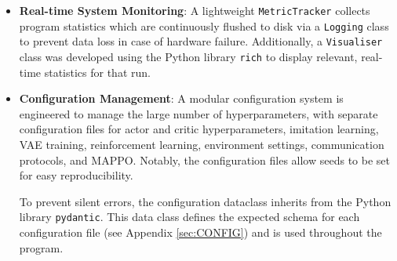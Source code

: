 \begin{itemize}
\item \textbf{Real-time System Monitoring}:
A lightweight \lstinline[language=Python]|MetricTracker| collects program statistics which are continuously flushed to disk via a \lstinline[language=Python]|Logging| class to prevent data loss in case of hardware failure.
Additionally, a \lstinline[language=Python]|Visualiser| class was developed using the Python library \lstinline[language=Python]|rich| \cite{rich} to display relevant, real-time statistics for that run.





\item \textbf{Configuration Management}:
A modular configuration system is engineered to manage the large number of hyperparameters, with separate configuration files for actor and critic hyperparameters, imitation learning, VAE training, reinforcement learning, environment settings, communication protocols, and MAPPO.
Notably, the configuration files allow seeds to be set for easy reproducibility.

To prevent silent errors, the configuration dataclass inherits from the Python library \lstinline[language=Python]|pydantic|.
This data class defines the expected schema for each configuration file (see Appendix \ref{sec:CONFIG}) and is used throughout the program.


\end{itemize}

